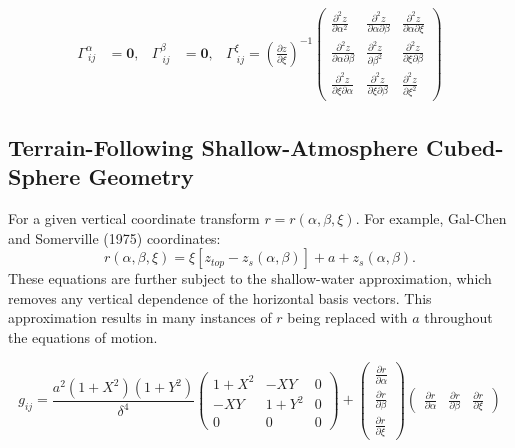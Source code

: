 \documentclass{article}
\newcommand{\vb}{\mathbf}
\newcommand{\pdiff}[2]{\frac{\partial #1}{\partial #2}}
\begin{document}
\begin{align}
\Gamma^{\alpha}_{\ i j} &= \vb{0}, & \Gamma^{\beta}_{\ i j} &= \vb{0}, & \Gamma^{\xi}_{\ i j} = \left( \pdiff{z}{\xi} \right)^{-1} \left( \begin{array}{ccc} \frac{\partial^2 z}{\partial \alpha^2} & \frac{\partial^2 z}{\partial \alpha \partial \beta} & \frac{\partial^2 z}{\partial \alpha \partial \xi} \\[2.0ex] \frac{\partial^2 z}{\partial \alpha \partial \beta} & \frac{\partial^2 z}{\partial \beta^2} & \frac{\partial^2 z}{\partial \xi \partial \beta} \\[2.0ex] \frac{\partial^2 z}{\partial \xi \partial \alpha} & \frac{\partial^2 z}{\partial \xi \partial \beta} & \frac{\partial^2 z}{\partial \xi^2} \end{array} \right) 
\end{align}

\subsection{Terrain-Following Shallow-Atmosphere Cubed-Sphere Geometry}

For a given vertical coordinate transform $r = r(\alpha, \beta, \xi)$.  For example, Gal-Chen and Somerville (1975) coordinates:
\begin{equation}
r(\alpha, \beta, \xi) = \xi \left[ z_{top} - z_s(\alpha, \beta) \right] + a + z_s(\alpha, \beta).
\end{equation}  These equations are further subject to the shallow-water approximation, which removes any vertical dependence of the horizontal basis vectors.  This approximation results in many instances of $r$ being replaced with $a$ throughout the equations of motion.

\begin{equation}
g_{ij} = \frac{a^2 (1+X^2) (1+Y^2)}{\delta^4} \left( \begin{array}{ccc} 1+X^2 & - X Y & 0 \\[2.0ex] - X Y & 1+Y^2 & 0 \\[2.0ex] 0 & 0 & 0 \end{array} \right) + \left( \begin{array}{c} \pdiff{r}{\alpha} \\[2.0ex] \pdiff{r}{\beta} \\[2.0ex] \pdiff{r}{\xi} \end{array} \right) \left( \begin{array}{ccc} \pdiff{r}{\alpha} & \pdiff{r}{\beta} & \pdiff{r}{\xi} \end{array} \right)
\end{equation}
\end{document}
